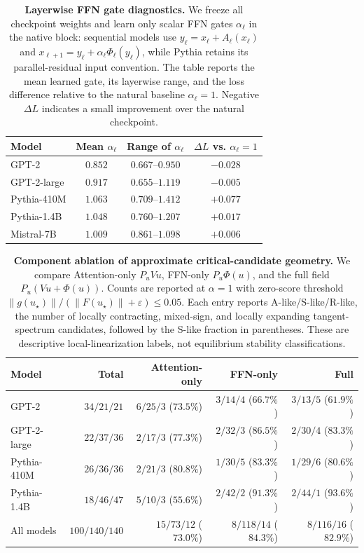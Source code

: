 \documentclass[11pt]{article}
\begin{document}
\begin{table}[H]
\centering
\small
\caption{\textbf{Layerwise FFN gate diagnostics.}
We freeze all checkpoint weights and learn only scalar FFN gates
$\alpha_\ell$ in the native block: sequential models use
$y_\ell=x_\ell+A_\ell(x_\ell)$ and
$x_{\ell+1}=y_\ell+\alpha_\ell\Phi_\ell(y_\ell)$, while Pythia retains its
parallel-residual input convention. The table reports the mean learned gate, its
layerwise range, and the loss
difference relative to the natural baseline $\alpha_\ell=1$. Negative
$\Delta L$ indicates a small improvement over the natural checkpoint.}
\label{tab:ffn-gate-diagnostics}
\begin{tabular}{lccc}
\toprule
Model & Mean $\alpha_\ell$ & Range of $\alpha_\ell$ & $\Delta L$ vs. $\alpha_\ell=1$ \\
\midrule
GPT-2        & $0.852$ & $0.667$--$0.950$ & $-0.028$ \\
GPT-2-large  & $0.917$ & $0.655$--$1.119$ & $-0.005$ \\
Pythia-410M  & $1.063$ & $0.709$--$1.412$ & $+0.077$ \\
Pythia-1.4B  & $1.048$ & $0.760$--$1.207$ & $+0.017$ \\
Mistral-7B   & $1.009$ & $0.861$--$1.098$ & $+0.006$ \\
\bottomrule
\end{tabular}
\end{table}

\begin{table}[!t]
\centering
\small
\caption{\textbf{Component ablation of approximate critical-candidate geometry.}
We compare Attention-only $P_uVu$, FFN-only $P_u\Phi(u)$, and the full field
$P_u(Vu+\Phi(u))$. Counts are reported at $\alpha=1$ with zero-score threshold
$\|g(u_\star)\|/(\|F(u_\star)\|+\varepsilon)\leq 0.05$. Each entry reports
A-like/S-like/R-like, the number of locally contracting, mixed-sign, and locally
expanding tangent-spectrum candidates, followed by the S-like fraction in
parentheses. These are descriptive local-linearization labels, not equilibrium
stability classifications.}
\label{tab:ffn-restructure-critical-geometry-wide}
\begin{tabular}{lrrrr}
\toprule
Model
& Total
& Attention-only
& FFN-only
& Full \\
\midrule
GPT-2
& $34/21/21$
& $6/25/3$ \;($73.5\%$)
& $3/14/4$ \;($66.7\%$)
& $3/13/5$ \;($61.9\%$) \\
GPT-2-large
& $22/37/36$
& $2/17/3$ \;($77.3\%$)
& $2/32/3$ \;($86.5\%$)
& $2/30/4$ \;($83.3\%$) \\
Pythia-410M
& $26/36/36$
& $2/21/3$ \;($80.8\%$)
& $1/30/5$ \;($83.3\%$)
& $1/29/6$ \;($80.6\%$) \\
Pythia-1.4B
& $18/46/47$
& $5/10/3$ \;($55.6\%$)
& $2/42/2$ \;($91.3\%$)
& $2/44/1$ \;($93.6\%$) \\
\midrule
All models
& $100/140/140$
& $15/73/12$ \;($73.0\%$)
& $8/118/14$ \;($84.3\%$)
& $8/116/16$ \;($82.9\%$) \\
\bottomrule
\end{tabular}
\end{table}
\end{document}
